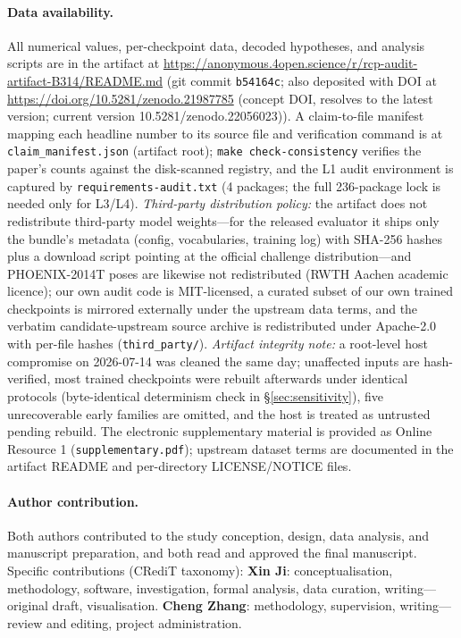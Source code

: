 \documentclass[pdflatex,sn-chicago]{sn-jnl}
\begin{document}
\paragraph{Data availability.} All numerical values, per-checkpoint data, decoded hypotheses, and analysis scripts are in the artifact at \url{https://anonymous.4open.science/r/rcp-audit-artifact-B314/README.md} (git commit \texttt{b54164c}; also deposited with DOI at \url{https://doi.org/10.5281/zenodo.21987785} (concept DOI, resolves to the latest version; current version 10.5281/zenodo.22056023)). A claim-to-file manifest mapping each headline number to its source file and verification command is at \texttt{claim\_manifest.json} (artifact root); \texttt{make check-consistency} verifies the paper's counts against the disk-scanned registry, and the L1 audit environment is captured by \texttt{requirements-audit.txt} (4 packages; the full 236-package lock is needed only for L3/L4). \emph{Third-party distribution policy:} the artifact does not redistribute third-party model weights---for the released evaluator it ships only the bundle's metadata (config, vocabularies, training log) with SHA-256 hashes plus a download script pointing at the official challenge distribution---and PHOENIX-2014T poses are likewise not redistributed (RWTH Aachen academic licence); our own audit code is MIT-licensed, a curated subset of our own trained checkpoints is mirrored externally under the upstream data terms, and the verbatim candidate-upstream source archive is redistributed under Apache-2.0 with per-file hashes (\texttt{third\_party/}). \emph{Artifact integrity note:} a root-level host compromise on 2026-07-14 was cleaned the same day; unaffected inputs are hash-verified, most trained checkpoints were rebuilt afterwards under identical protocols (byte-identical determinism check in \S\ref{sec:sensitivity}), five unrecoverable early families are omitted, and the host is treated as untrusted pending rebuild. The electronic supplementary material is provided as Online Resource 1 (\texttt{supplementary.pdf}); upstream dataset terms are documented in the artifact README and per-directory LICENSE/NOTICE files.
\paragraph{Author contribution.} Both authors contributed to the study conception, design, data analysis, and manuscript preparation, and both read and approved the final manuscript. Specific contributions (CRediT taxonomy): \textbf{Xin Ji}: conceptualisation, methodology, software, investigation, formal analysis, data curation, writing---original draft, visualisation. \textbf{Cheng Zhang}: methodology, supervision, writing---review and editing, project administration.
\appendix
\end{document}
